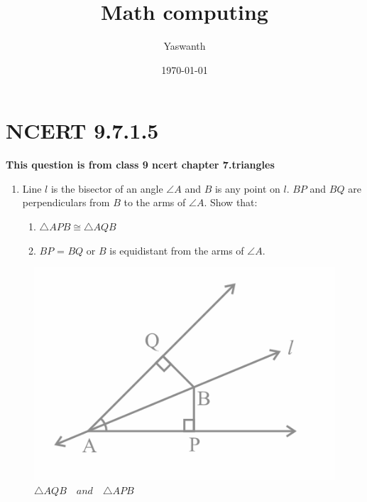 \documentclass[11pt, a4paper]{article}
\title{ Math computing}
\author{ Yaswanth }
\date{\today}
\begin{document}
\vspace{-\baselineskip}
\maketitle

\section*{NCERT 9.7.1.5}

\textbf{This question is from class 9 ncert chapter 7.triangles}
\begin{enumerate}
    \item Line $l$ is the bisector of an angle $\angle A$ and $B$ is any point on $l$. $BP$ and $BQ$ are perpendiculars from $B$ to the arms of $\angle A$. Show that:
%
\begin{enumerate}
    \item $\triangle  APB \cong \triangle AQB$  
    \item $BP$ = $BQ$ or $B$ is equidistant from the arms of $\angle A$.
 \end{enumerate}
\end{enumerate}
\begin{figure}[H]
    \centering
    \includegraphics[width=1\columnwidth]{fig_mc.png}
    \caption{$\triangle AQB \hspace{12pt} and \hspace{12pt} \triangle APB$}
    \label{fig:math_comp1}
\end{figure}
\pagebreak
%
\end{document}
